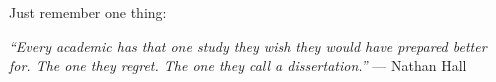 

Just remember one thing:

{\it ``Every academic has that one study they wish they would have prepared better for. The one they regret. The one they call a dissertation.''}
--- Nathan Hall
